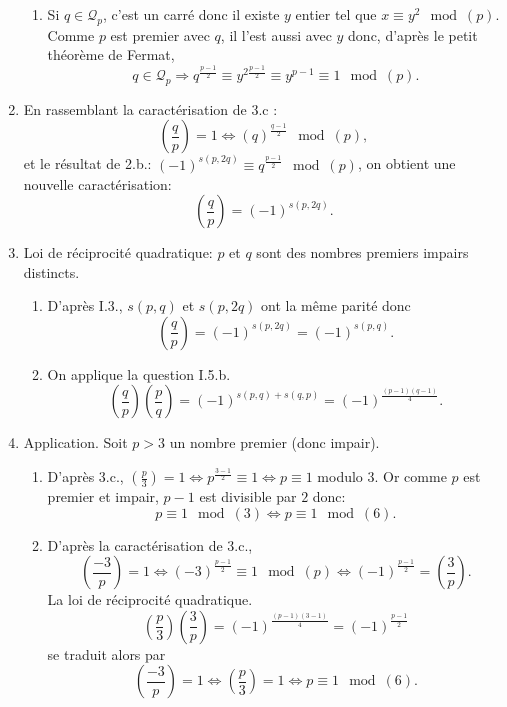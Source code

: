 \begin{enumerate}
\begin{enumerate}
    \item Si $q \in \mathcal{Q}_p$, c'est un carré donc il existe $y$ entier tel que $x \equiv y^2 \mod (p)$. Comme $p$ est premier avec $q$, il l'est aussi avec $y$ donc, d'après le petit théorème de Fermat,
\[
  q \in \mathcal{Q}_p \Rightarrow q^{\frac{p-1}{2}} \equiv y^{2\frac{p-1}{2}} \equiv y^{p-1} \equiv 1 \mod (p).
\]
  \end{enumerate}

  \item En rassemblant la caractérisation de 3.c :
\[
  \left(\frac{q}{p}\right) = 1 \Leftrightarrow (q)^{\frac{q-1}{2}} \mod (p),
\]
et le résultat de 2.b.: $(-1)^{s(p,2q)} \equiv q^{\frac{p-1}{2}} \mod (p)$, on obtient une nouvelle caractérisation:
\[
  \left(\frac{q}{p}\right) = (-1)^{s(p,2q)}. 
\]
  
  \item Loi de réciprocité quadratique: $p$ et $q$ sont des nombres premiers impairs distincts.
  \begin{enumerate}
    \item D'après I.3., $s(p,q)$ et $s(p,2q)$ ont la même parité donc
\[
  \left(\frac{q}{p}\right) = (-1)^{s(p,2q)} = (-1)^{s(p,q)}.
\]

    \item On applique la question I.5.b.
\[
  \left(\frac{q}{p}\right)\left(\frac{p}{q}\right) = (-1)^{s(p,q) + s(q,p)} = (-1)^{\frac{(p-1)(q-1)}{4}}.
\]

  \end{enumerate}

  \item Application. Soit $p>3$ un nombre premier (donc impair).
  \begin{enumerate}
    \item D'après 3.c., $\left(\frac{p}{3}\right) = 1 \Leftrightarrow p^{\frac{3-1}{2}} \equiv 1 \Leftrightarrow p \equiv 1$ modulo $3$. Or comme $p$ est premier et impair, $p-1$ est divisible par $2$ donc:
\[
  p \equiv 1 \mod (3) \Leftrightarrow p \equiv 1 \mod (6).
\]

    \item D'après la caractérisation de 3.c., 
\[
  \left(\frac{-3}{p}\right) = 1 \Leftrightarrow (-3)^{\frac{p-1}{2}} \equiv 1 \mod (p)
  \Leftrightarrow (-1)^{\frac{p-1}{2}} = \left(\frac{3}{p}\right).
\]   
La loi de réciprocité quadratique.
\[
  \left(\frac{p}{3}\right)\left(\frac{3}{p}\right) = (-1)^{\frac{(p-1)(3-1)}{4}} = (-1)^{\frac{p-1}{2}}
\]
se traduit alors par 
\[
  \left(\frac{-3}{p}\right) = 1 \Leftrightarrow  \left(\frac{p}{3}\right) = 1
  \Leftrightarrow p \equiv 1 \mod (6).
\]


\end{enumerate}
\end{enumerate}

